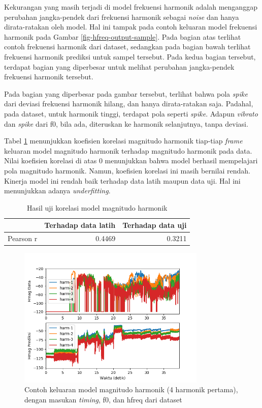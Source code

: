Kekurangan yang masih terjadi di model frekuensi harmonik adalah menganggap perubahan jangka-pendek dari frekuensi harmonik sebagai \textit{noise} dan hanya dirata-ratakan oleh model. Hal ini tampak pada contoh keluaran model frekuensi harmonik pada Gambar \ref{fig-hfreq-output-sample}. Pada bagian atas terlihat contoh frekuensi harmonik dari dataset, sedangkan pada bagian bawah terlihat frekuensi harmonik prediksi untuk sampel tersebut. Pada kedua bagian tersebut, terdapat bagian yang diperbesar untuk melihat perubahan jangka-pendek frekuensi harmonik tersebut. 

Pada bagian yang diperbesar pada gambar tersebut, terlihat bahwa pola \textit{spike} dari deviasi frekuensi harmonik hilang, dan hanya dirata-ratakan saja. Padahal, pada dataset, untuk harmonik tinggi, terdapat pola seperti \textit{spike}. Adapun \textit{vibrato} dan \textit{spike} dari f0, bila ada, diteruskan ke harmonik selanjutnya, tanpa deviasi.

Tabel \ref{tab-mag-testing-results} menunjukkan koefisien korelasi magnitudo harmonik tiap-tiap \textit{frame} keluaran model magnitudo harmonik terhadap magnitudo harmonik pada data. Nilai koefisien korelasi di atas 0 menunjukkan bahwa model berhasil mempelajari pola magnitudo harmonik. Namun, koefisien korelasi ini masih bernilai rendah. Kinerja model ini rendah baik terhadap data latih maupun data uji. Hal ini menunjukkan adanya \textit{underfitting}.

\begin{table}[htbp]
    \centering
    \caption{Hasil uji korelasi model magnitudo harmonik}\label{tab-mag-testing-results}
    \begin{tabular}{ |l|r|r| } 
     \cline{2-3}
     \multicolumn{1}{l|}{}&Terhadap data latih&Terhadap data uji\\\hline
	 Pearson r&0.4469  &0.3211\\\hline
    \end{tabular}
\end{table}

\begin{figure}[htbp]
    \centering
    \includegraphics[width=0.8\textwidth]{resources/Analisis_Hmag.png}
    \caption{Contoh keluaran model magnitudo harmonik (4 harmonik pertama), dengan masukan \textit{timing}, f0, dan hfreq dari dataset}\label{fig-hmag-output-sample}
\end{figure}

